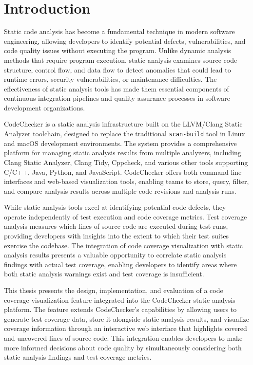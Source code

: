 \chapter{Introduction}
\label{ch:intro}

Static code analysis has become a fundamental technique in modern software engineering, allowing developers to identify potential defects, vulnerabilities, and code quality issues without executing the program. Unlike dynamic analysis methods that require program execution, static analysis examines source code structure, control flow, and data flow to detect anomalies that could lead to runtime errors, security vulnerabilities, or maintenance difficulties. The effectiveness of static analysis tools has made them essential components of continuous integration pipelines and quality assurance processes in software development organizations.

CodeChecker is a static analysis infrastructure built on the LLVM/Clang Static Analyzer toolchain, designed to replace the traditional \texttt{scan-build} tool in Linux and macOS development environments. The system provides a comprehensive platform for managing static analysis results from multiple analyzers, including Clang Static Analyzer, Clang Tidy, Cppcheck, and various other tools supporting C/C++, Java, Python, and JavaScript. CodeChecker offers both command-line interfaces and web-based visualization tools, enabling teams to store, query, filter, and compare analysis results across multiple code revisions and analysis runs.

While static analysis tools excel at identifying potential code defects, they operate independently of test execution and code coverage metrics. Test coverage analysis measures which lines of source code are executed during test runs, providing developers with insights into the extent to which their test suites exercise the codebase. The integration of code coverage visualization with static analysis results presents a valuable opportunity to correlate static analysis findings with actual test coverage, enabling developers to identify areas where both static analysis warnings exist and test coverage is insufficient.

This thesis presents the design, implementation, and evaluation of a code coverage visualization feature integrated into the CodeChecker static analysis platform. The feature extends CodeChecker's capabilities by allowing users to generate test coverage data, store it alongside static analysis results, and visualize coverage information through an interactive web interface that highlights covered and uncovered lines of source code. This integration enables developers to make more informed decisions about code quality by simultaneously considering both static analysis findings and test coverage metrics.

